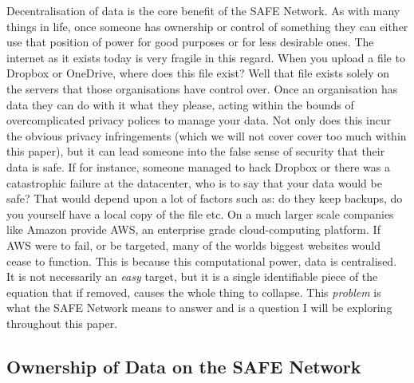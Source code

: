 \documentclass{l4proj}
\begin{document}
Decentralisation of data is the core benefit of the SAFE Network. As with many things in life, once someone has ownership or control of something they can either use that position of power for good purposes or for less desirable ones. The internet as it exists today is very fragile in this regard. When you upload a file to Dropbox or OneDrive, where does this file exist? Well that file exists solely on the servers that those organisations have control over. Once an organisation has data they can do with it what they please, acting within the bounds of overcomplicated privacy polices to manage your data. Not only does this incur the obvious privacy infringements (which we will not cover cover too much within this paper), but it can lead someone into the false sense of security that their data is safe. If for instance, someone managed to hack Dropbox or there was a catastrophic failure at the datacenter, who is to say that your data would be safe? That would depend upon a lot of factors such as: do they keep backups, do you yourself have a local copy of the file etc. On a much larger scale companies like Amazon provide AWS, an enterprise grade cloud-computing platform. If AWS were to fail, or be targeted, many of the worlds biggest websites would cease to function. This is because this computational power, data is centralised. It is not necessarily an \textit{easy} target, but it is a single identifiable piece of the equation that if removed, causes the whole thing to collapse. This \textit{problem} is what the SAFE Network means to answer and is a question I will be exploring throughout this paper.

\subsection{Ownership of Data on the SAFE Network}
\end{document}
